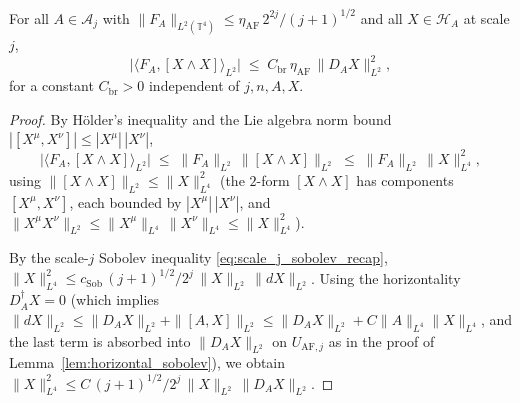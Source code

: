 \begin{lemma}
\label{lem:bracket_bound}
For all $A\in\mathcal{A}_{j}$ with
$\|F_{A}\|_{L^{2}(\mathbb{T}^{4})}\le\eta_{\mathrm{AF}}\,
2^{2j}/(j+1)^{1/2}$ and all $X\in\mathcal{H}_{A}$ at scale
$j$,
\begin{equation}
\label{eq:bracket_bound}
  \bigl|\langle F_{A},[X\wedge X]\rangle_{L^{2}}\bigr|
  \;\le\;C_{\mathrm{br}}\,\eta_{\mathrm{AF}}\,
  \|D_{A}X\|_{L^{2}}^{2},
\end{equation}
for a constant $C_{\mathrm{br}}>0$ independent of $j,n,A,X$.
\end{lemma}

\begin{proof}
By H\"older's inequality and the Lie algebra norm bound
$|[X^{\mu},X^{\nu}]|\le|X^{\mu}|\,|X^{\nu}|$,
\begin{equation}
\label{eq:bracket_holder}
  \bigl|\langle F_{A},[X\wedge X]\rangle_{L^{2}}\bigr|
  \;\le\;\|F_{A}\|_{L^{2}}\,\|[X\wedge X]\|_{L^{2}}
  \;\le\;\|F_{A}\|_{L^{2}}\,\|X\|_{L^{4}}^{2},
\end{equation}
using $\|[X\wedge X]\|_{L^{2}}\le\|X\|_{L^{4}}^{2}$ (the
$2$-form $[X\wedge X]$ has components $[X^{\mu},X^{\nu}]$,
each bounded by $|X^{\mu}|\,|X^{\nu}|$, and
$\|X^{\mu}X^{\nu}\|_{L^{2}}\le\|X^{\mu}\|_{L^{4}}\,
\|X^{\nu}\|_{L^{4}}\le\|X\|_{L^{4}}^{2}$).

By the scale-$j$ Sobolev inequality
\eqref{eq:scale_j_sobolev_recap},
$\|X\|_{L^{4}}^{2}\le c_{\mathrm{Sob}}\,(j+1)^{1/2}/2^{j}\,
\|X\|_{L^{2}}\,\|dX\|_{L^{2}}$. Using the horizontality
$D_{A}^{\dagger}X=0$ (which implies $\|dX\|_{L^{2}}\le
\|D_{A}X\|_{L^{2}}+\|[A,X]\|_{L^{2}}\le
\|D_{A}X\|_{L^{2}}+C\|A\|_{L^{4}}\|X\|_{L^{4}}$, and the
last term is absorbed into $\|D_{A}X\|_{L^{2}}$ on
$U_{\mathrm{AF},j}$ as in the proof of
Lemma~\ref{lem:horizontal_sobolev}), we obtain
$\|X\|_{L^{4}}^{2}\le C\,(j+1)^{1/2}/2^{j}\,\|X\|_{L^{2}}\,
\|D_{A}X\|_{L^{2}}$.


\end{proof}
